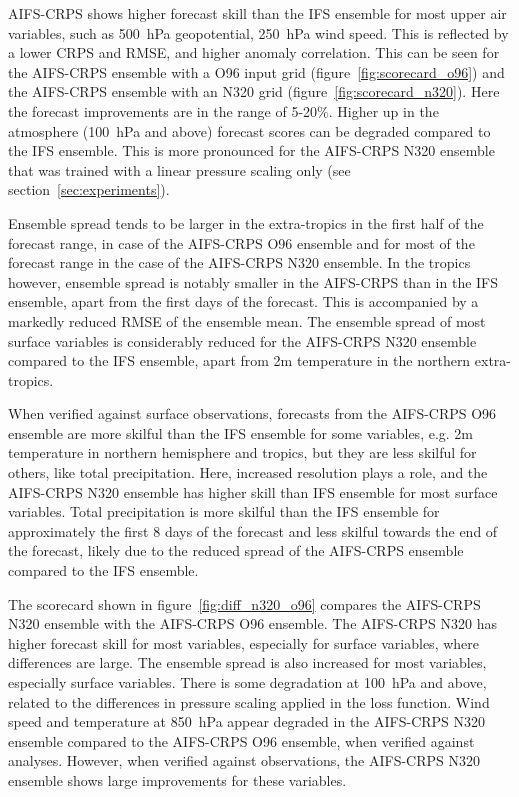 \documentclass{article}
\begin{document}
AIFS-CRPS shows higher forecast skill than the IFS ensemble for most upper air variables, such as 500~hPa geopotential, 250~hPa wind speed. This is reflected by a lower CRPS and RMSE, and higher anomaly correlation. This can be seen for the AIFS-CRPS ensemble with a O96 input grid (figure~\ref{fig:scorecard_o96}) and the AIFS-CRPS ensemble with an N320 grid (figure~\ref{fig:scorecard_n320}). Here the forecast improvements are in the range of 5-20$\%$. Higher up in the atmosphere (100~hPa and above) forecast scores can be degraded compared to the IFS ensemble. This is more pronounced for the AIFS-CRPS N320 ensemble that was trained with a linear pressure scaling only (see section~\ref{sec:experiments}). 

Ensemble spread tends to be larger in the extra-tropics in the first half of the forecast range, in case of the AIFS-CRPS O96 ensemble and for most of the forecast range in the case of the AIFS-CRPS N320 ensemble. In the tropics however, ensemble spread is notably smaller in the AIFS-CRPS than in the IFS ensemble, apart from the first days of the forecast. This is accompanied by a markedly reduced RMSE of the ensemble mean. The ensemble spread of most surface variables is considerably reduced for the AIFS-CRPS N320 ensemble compared to the IFS ensemble, apart from 2m temperature in the northern extra-tropics.

When verified against surface observations, forecasts from the AIFS-CRPS O96 ensemble are more skilful than the IFS ensemble for some variables, e.g. 2m temperature in northern hemisphere and tropics, but they are less skilful for others, like total precipitation. Here, increased resolution plays a role, and the AIFS-CRPS N320 ensemble has higher skill than IFS ensemble for most surface variables. Total precipitation is more skilful than the IFS ensemble for approximately the first 8 days of the forecast and less skilful towards the end of the forecast, likely due to the reduced spread of the AIFS-CRPS ensemble compared to the IFS ensemble.

The scorecard shown in figure~\ref{fig:diff_n320_o96} compares the AIFS-CRPS N320 ensemble with the AIFS-CRPS O96 ensemble. The AIFS-CRPS N320 has higher forecast skill for most variables, especially for surface variables, where differences are large. The ensemble spread is also increased for most variables, especially surface variables. There is some degradation at 100~hPa and above, related to the differences in pressure scaling applied in the loss function. Wind speed and temperature at 850~hPa appear degraded in the AIFS-CRPS N320 ensemble compared to the AIFS-CRPS O96 ensemble, when verified against analyses. However, when verified against observations, the AIFS-CRPS N320 ensemble shows large improvements for these variables.
\end{document}
